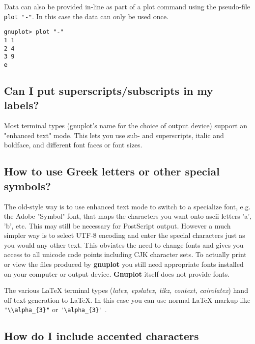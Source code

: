 \documentclass[a4paper,11pt]{article}
\newcommand{\gnuplot}{\textbf{gnuplot }}
\newcommand{\Gnuplot}{\textbf{Gnuplot }}
\begin{document}
Data can also be provided in-line as part of a plot command using the
pseudo-file \verb+plot "-"+.  In this case the data can only be used
once.

\small
\begin{verbatim}
gnuplot> plot "-"
1 1
2 4
3 9
e
\end{verbatim}
\normalsize


\subsection{Can I put superscripts/subscripts in my labels?}

Most terminal types (gnuplot's name for the choice of output device) support
an "enhanced text" mode.  This lets you use sub- and superscripts, italic and
boldface, and different font faces or font sizes.

\subsection{How to use Greek letters or other special symbols?}

The old-style way is to use enhanced text mode to switch to a specialize font,
e.g. the Adobe "Symbol" font, that maps the characters you want onto ascii
letters 'a', 'b', etc.  This may still be necessary for PostScript output.
However a much simpler way is to select UTF-8 encoding and enter the
special characters just as you would any other text.
This obviates the need to change fonts and gives you access to all unicode
code points including CJK character sets.  To actually print or view the
files produced by \gnuplot you still need appropriate fonts installed on
your computer or output device.  \Gnuplot itself does not provide fonts.

The various \LaTeX{} terminal types (\textit{latex, epslatex, tikz, context, cairolatex})
hand off text generation to \LaTeX{}. In this case you can use normal \LaTeX{}
markup like \verb+"\\alpha_{3}"+ or \verb+'\alpha_{3}'+ .

\subsection{How do I include accented characters}
\end{document}
